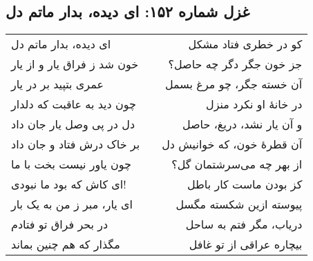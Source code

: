 \begin{center}
\section*{غزل شماره ۱۵۲: ای دیده، بدار ماتم دل}
\label{sec:152}
\begin{longtable}{l p{0.5cm} r}
ای دیده، بدار ماتم دل
&&
کو در خطری فتاد مشکل
\\
خون شد ز فراق یار و از یار
&&
جز خون جگر دگر چه حاصل؟
\\
عمری بتپید بر در یار
&&
آن خسته جگر، چو مرغ بسمل
\\
چون دید به عاقبت که دلدار
&&
در خانهٔ او نکرد منزل
\\
دل در پی وصل یار جان داد
&&
و آن یار نشد، دریغ، حاصل
\\
بر خاک درش فتاد و جان داد
&&
آن قطرهٔ خون، که خوانیش دل
\\
چون یاور نیست بخت با ما
&&
از بهر چه می‌سرشتمان گل؟
\\
ای کاش که بود ما نبودی!
&&
کز بودن ماست کار باطل
\\
ای یار، مبر ز من به یک بار
&&
پیوسته ازین شکسته مگسل
\\
در بحر فراق تو فتادم
&&
دریاب، مگر فتم به ساحل
\\
مگذار که هم چنین بماند
&&
بیچاره عراقی از تو غافل
\\
\end{longtable}
\end{center}
